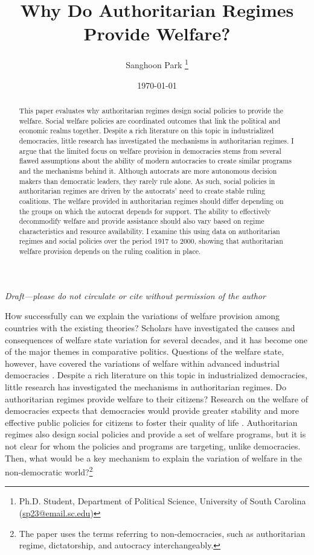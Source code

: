 \documentclass[12pt, letterpage, notitlepage]{article}
\title{\bf Why Do Authoritarian Regimes Provide Welfare?}
\author{Sanghoon Park
	\thanks{\small Ph.D. Student, Department of Political Science, University of South Carolina\\
		 \hspace*{1.8em}(\href{sp23@email.sc.edu}{sp23@email.sc.edu})}}
\date{\today}
\begin{document}
	\maketitle
   \begin{center}
	\centering \onehalfspacing \it Draft---please do not circulate or cite without permission of the author

\end{center}

	
\begin{abstract}
\onehalfspacing
\noindent This paper evaluates why authoritarian regimes design social policies to provide the welfare. Social welfare policies are coordinated outcomes that link the political and economic realms together. Despite a rich literature on this topic in industrialized democracies, little research has investigated the mechanisms in authoritarian regimes. I argue that the limited focus on welfare provision in democracies stems from several flawed assumptions about the ability of modern autocracies to create similar programs and the mechanisms behind it. Although autocrats are more autonomous decision makers than democratic leaders, they rarely rule alone. As such, social policies in authoritarian regimes are driven by the autocrats’ need to create stable ruling coalitions. The welfare provided in authoritarian regimes should differ depending on the groups on which the autocrat depends for support. The ability to effectively decommodify welfare and provide assistance should also vary based on regime characteristics and resource availability. I examine this using data on authoritarian regimes and social policies over the period 1917 to 2000, showing that authoritarian welfare provision depends on the ruling coalition in place.
\end{abstract}


\noindent \lettrine{H}ow successfully can we explain the variations of welfare provision among countries with the existing theories? Scholars have investigated the causes and consequences of welfare state variation for several decades, and it has become one of the major themes in comparative politics. Questions of the welfare state, however, have covered the variations of welfare within advanced industrial democracies \citep{Pierson1996, Pierson2000, Miller2015c}. Despite a rich literature on this topic in industrialized democracies, little research has investigated the mechanisms in authoritarian regimes. Do authoritarian regimes provide welfare to their citizens? Research on the welfare of democracies expects that democracies would provide greater stability and more effective public policies for citizens to foster their quality of life \citep{Gerring2012}. Authoritarian regimes also design social policies and provide a set of welfare programs, but it is not clear for whom the policies and programs are targeting, unlike democracies. Then, what would be a key mechanism to explain the variation of welfare in the non-democratic world?\footnote{The paper uses the terms referring to non-democracies, such as authoritarian regime, dictatorship, and autocracy interchangeably.}\par
\end{document}
